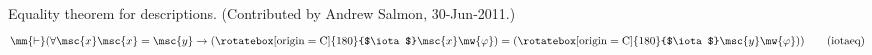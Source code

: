 \begin{lemma} Equality theorem for descriptions. 
(Contributed by Andrew Salmon,
       30-Jun-2011.)
\begin{align}
\mm{\vdash} ( \forall \msc{x} \msc{x} = \msc{y} \rightarrow (
    \mathrm{\rotatebox[origin=C]{180}{$\iota$}} \msc{x} \mw{\varphi} ) = (
    \mathrm{\rotatebox[origin=C]{180}{$\iota$}} \msc{y} \mw{\varphi} )
    )\label{eq:iotaeq}\tag{iotaeq}
\end{align}
\end{lemma}



%

%

%

